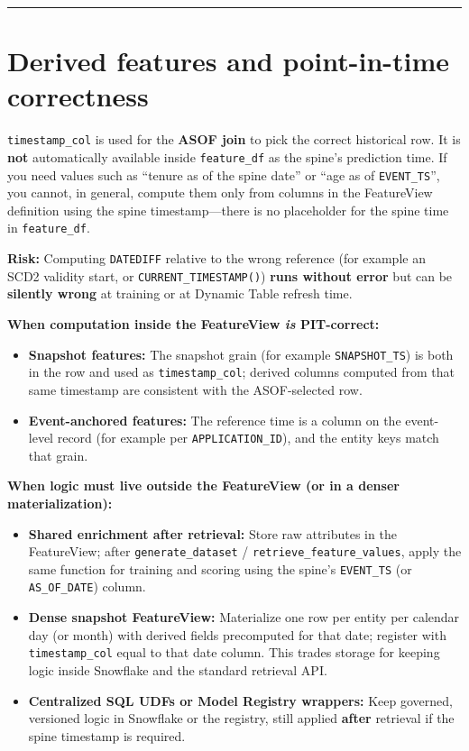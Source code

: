 \documentclass[
  letterpaper,
  DIV=11,
  numbers=noendperiod]{scrreprt}
\providecommand{\tightlist}{%
  \setlength{\itemsep}{0pt}\setlength{\parskip}{0pt}}\usepackage{longtable,booktabs,array}
\begin{document}
\begin{center}\rule{0.5\linewidth}{0.5pt}\end{center}

\hypertarget{derived-features-and-point-in-time-correctness}{%
\section{Derived features and point-in-time
correctness}\label{derived-features-and-point-in-time-correctness}}

\texttt{timestamp\_col} is used for the \textbf{ASOF join} to pick the
correct historical row. It is \textbf{not} automatically available
inside \texttt{feature\_df} as the spine's prediction time. If you need
values such as ``tenure as of the spine date'' or ``age as of
\texttt{EVENT\_TS}'', you cannot, in general, compute them only from
columns in the FeatureView definition using the spine timestamp---there
is no placeholder for the spine time in \texttt{feature\_df}.

\textbf{Risk:} Computing \texttt{DATEDIFF} relative to the wrong
reference (for example an SCD2 validity start, or
\texttt{CURRENT\_TIMESTAMP()}) \textbf{runs without error} but can be
\textbf{silently wrong} at training or at Dynamic Table refresh time.

\textbf{When computation inside the FeatureView \emph{is} PIT-correct:}

\begin{itemize}
\tightlist
\item
  \textbf{Snapshot features:} The snapshot grain (for example
  \texttt{SNAPSHOT\_TS}) is both in the row and used as
  \texttt{timestamp\_col}; derived columns computed from that same
  timestamp are consistent with the ASOF-selected row.
\item
  \textbf{Event-anchored features:} The reference time is a column on
  the event-level record (for example per \texttt{APPLICATION\_ID}), and
  the entity keys match that grain.
\end{itemize}

\textbf{When logic must live outside the FeatureView (or in a denser
materialization):}

\begin{itemize}
\tightlist
\item
  \textbf{Shared enrichment after retrieval:} Store raw attributes in
  the FeatureView; after \texttt{generate\_dataset} /
  \texttt{retrieve\_feature\_values}, apply the same function for
  training and scoring using the spine's \texttt{EVENT\_TS} (or
  \texttt{AS\_OF\_DATE}) column.
\item
  \textbf{Dense snapshot FeatureView:} Materialize one row per entity
  per calendar day (or month) with derived fields precomputed for that
  date; register with \texttt{timestamp\_col} equal to that date column.
  This trades storage for keeping logic inside Snowflake and the
  standard retrieval API.
\item
  \textbf{Centralized SQL UDFs or Model Registry wrappers:} Keep
  governed, versioned logic in Snowflake or the registry, still applied
  \textbf{after} retrieval if the spine timestamp is required.
\end{itemize}
\end{document}
